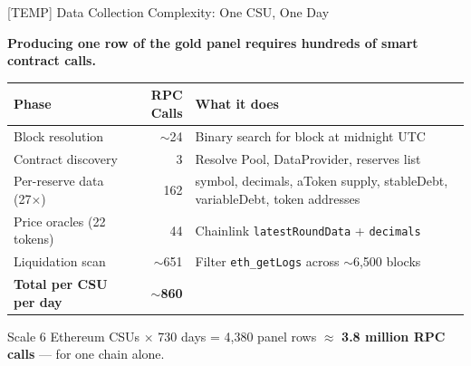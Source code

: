 \begin{frame}{[TEMP] Data Collection Complexity: One CSU, One Day}

\textbf{Producing one row of the gold panel requires hundreds of smart contract calls.}

\vspace{0.2cm}

\renewcommand{\arraystretch}{1.15}
\footnotesize
\begin{tabular}{p{4.0cm} r p{5.5cm}}
\toprule
\textbf{Phase} & \textbf{RPC Calls} & \textbf{What it does} \\
\midrule
Block resolution & $\sim$24 & Binary search for block at midnight UTC \\
Contract discovery & 3 & Resolve Pool, DataProvider, reserves list \\
Per-reserve data (27$\times$) & 162 & symbol, decimals, aToken supply, stableDebt, variableDebt, token addresses \\
Price oracles (22 tokens) & 44 & Chainlink \texttt{latestRoundData} + \texttt{decimals} \\
Liquidation scan & $\sim$651 & Filter \texttt{eth\_getLogs} across $\sim$6{,}500 blocks \\
\midrule
\textbf{Total per CSU per day} & \textbf{$\sim$860} & \\
\bottomrule
\end{tabular}

\vspace{0.3cm}

\begin{block}{Scale}
6 Ethereum CSUs $\times$ 730 days = 4{,}380 panel rows $\approx$ \textbf{3.8 million RPC calls} --- for one chain alone.
\end{block}

\end{frame}


